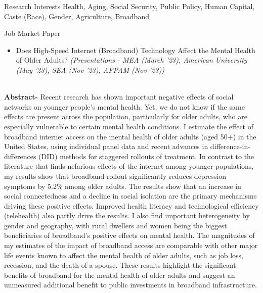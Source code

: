 \documentclass{resume} %
\begin{document}

\begin{rSection}{Research Interests}
Health, Aging, Social Security, Public Policy, Human Capital, Caste (Race), Gender, Agriculture, Broadband
\end{rSection}


\begin{rSection}{Job Market Paper}
\begin{itemize}
\item Does High-Speed Internet (Broadband) Technology Affect the Mental Health of Older Adults? \textit{\scriptsize{(Presentations - MEA (March '23), American University (May '23), SEA (Nov '23), APPAM (Nov '23))}}
\end{itemize}
\\
\textbf{Abstract-} 
Recent research has shown important negative effects of social networks on younger people's mental health. Yet, we do not know if the same effects are present across the population, particularly for older adults, who are especially vulnerable to certain mental health conditions.
I estimate the effect of broadband internet access on the mental health of older adults (aged 50+) in the United States, using individual panel data and recent advances in difference-in-differences (DID) methods for staggered rollouts of treatment.
In contrast to the literature that finds nefarious effects of the internet among younger populations, my results show that broadband rollout significantly reduces depression symptoms by 5.2\% among older adults. The results show that an increase in social connectedness and a decline in social isolation are the primary mechanisms driving these positive effects. Improved health literacy and technological efficiency (telehealth) also partly drive the results.
I also find important heterogeneity by gender and geography, with rural dwellers and women being the biggest beneficiaries of broadband's positive effects on mental health. 
The magnitudes of my estimates of the impact of broadband access are comparable with other major life events known to affect the mental health of older adults, such as job loss, recession, and the death of a spouse. These results highlight the significant benefits of broadband for the mental health of older adults and suggest an unmeasured additional benefit to public investments in broadband infrastructure.  

\end{rSection}
\end{document}
